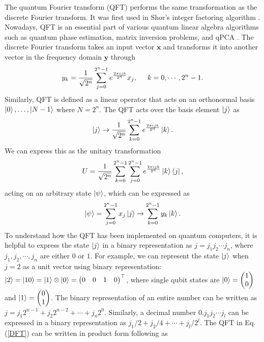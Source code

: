 \documentclass[10pt]{article}
\begin{document}
	The quantum Fourier transform (QFT) performs the same transformation as the discrete Fourier transform. It was first used in Shor's integer factoring algorithm \citep{Shor1994ShorAlgorithm}. Nowadays, QFT is an essential part of various quantum linear algebra algorithms such as quantum phase estimation, matrix inversion problems, and qPCA \citep{Nielsen2011QuantumComputing, Harrow2009HHLalgorithm, Lloyd2014QPCA}. The discrete Fourier transform takes an input vector $\mathbf{x}$ and transforms it into another vector in the frequency domain $\mathbf{y}$ through 
	\begin{equation}
		y_k = \frac{1}{\sqrt{2^n}} \sum_{j=0}^{2^n-1} e^{\frac{2\pi i j k}{2^n}} x_j, \hspace{0.5cm} k = 0, \cdots, 2^n-1.
	\end{equation}
	Similarly, QFT is defined as a linear operator that acts on an orthonormal basis $\ket{0}, \ldots, \ket{N-1}$ where $N = 2^n$. The QFT acts over the basis element $\ket{j}$ as
	\begin{equation} \label{DFT}
		\ket{j} \rightarrow \frac{1}{\sqrt{2^n}} \sum_{k=0}^{2^n-1} e^{\frac{2\pi i j k}{2^n}} \ket{k}.
	\end{equation}
	We can express this as the unitary transformation
	\begin{eqnarray}
		U=\frac{1}{\sqrt{2^n}} \sum_{k=0}^{2^n-1}  \sum_{j=0}^{2^n-1} e^{\frac{2\pi i j k}{2^n}} \ket{k}\bra{j},
	\end{eqnarray}
	acting on an arbitrary state $\ket{\psi}$, which can be expressed as
	\begin{equation}
		\ket{\psi}= \sum_{j=0}^{2^{n}-1}x_{j}\ket{j}\rightarrow \sum_{k=0}^{2^{n}-1}y_{k}\ket{k}.
	\end{equation}
	To understand how the QFT has been implemented on quantum computers, it is helpful to express the state $\ket{j}$ in a binary representation as $j=j_{1}j_{2}\cdots j_{n}$, where $j_{1},j_{2},\cdots,j_{n}$ are either $0$ or $1$. For example, we can represent the state $\ket{j}$ when $j=2$ as a unit vector using binary representation: $\ket{2}=\ket{10}=\ket{1}\otimes \ket{0}=\begin{pmatrix}
		0 & 0&1&0 
	\end{pmatrix}^\top$, where single qubit states are $\ket{0}=\begin{pmatrix}
		1\\0 
	\end{pmatrix}$ and $\ket{1}=\begin{pmatrix}
		0\\1 
	\end{pmatrix}$. The binary representation of an entire number can be written as $j = j_{1}2^{n-1} + j_{2}2^{n-2} + \cdots + j_{n}2^{0}$. Similarly, a decimal number $0.j_{1}j_{2}\cdots j_{l}$ can be expressed in a binary representation as $j_{1}/2 + j_{2}/4 + \cdots + j_{l}/2^{l}$. The QFT in Eq. (\ref{DFT}) can be written in product form following \citet{Nielsen2011QuantumComputing} as
\end{document}
